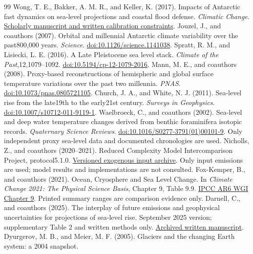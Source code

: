 \documentclass[11pt]{article}
\begin{document}
\begin{thebibliography}{99}
 Wong, T. E., Bakker, A. M. R., and Keller, K. (2017).
Impacts of Antarctic fast dynamics on sea-level projections and coastal flood defense.
\emph{Climatic Change}. \href{https://arxiv.org/abs/1612.07175}{Scholarly manuscript and written calibration constraints}.
 Jouzel, J., and coauthors (2007).
Orbital and millennial Antarctic climate variability over the past800,000 years.
\emph{Science}. \href{https://doi.org/10.1126/science.1141038}{doi:10.1126/science.1141038}.
 Spratt, R. M., and Lisiecki, L. E. (2016).
A Late Pleistocene sea level stack. \emph{Climate of the Past},12,1079--1092.
\href{https://doi.org/10.5194/cp-12-1079-2016}{doi:10.5194/cp-12-1079-2016}.
 Mann, M. E., and coauthors (2008).
Proxy-based reconstructions of hemispheric and global surface temperature
variations over the past two millennia. \emph{PNAS}.
\href{https://doi.org/10.1073/pnas.0805721105}{doi:10.1073/pnas.0805721105}.
 Church, J. A., and White, N. J. (2011).
Sea-level rise from the late19th to the early21st century. \emph{Surveys in Geophysics}.
\href{https://doi.org/10.1007/s10712-011-9119-1}{doi:10.1007/s10712-011-9119-1}.
 Waelbroeck, C., and coauthors (2002).
Sea-level and deep water temperature changes derived from benthic foraminifera
isotopic records. \emph{Quaternary Science Reviews}.
\href{https://doi.org/10.1016/S0277-3791(01)00101-9}{doi:10.1016/S0277-3791(01)00101-9}.
Only independent proxy sea-level data and documented chronologies are used.
 Nicholls, Z., and coauthors (2020--2021).
Reduced Complexity Model Intercomparison Project, protocol5.1.0.
\href{https://doi.org/10.5281/zenodo.4589756}{Versioned exogenous input archive}.
Only input emissions are used; model results and implementations are not consulted.
 Fox-Kemper, B., and coauthors (2021).
Ocean, Cryosphere and Sea Level Change. In \emph{Climate Change 2021:
The Physical Science Basis}, Chapter 9, Table 9.9.
\href{https://www.ipcc.ch/report/ar6/wg1/chapter/chapter-9/}{IPCC AR6 WGI Chapter 9}.
Printed summary ranges are comparison evidence only.
 Darnell, C., and coauthors (2025).
The interplay of future emissions and geophysical uncertainties for projections
of sea-level rise.
September 2025 version; supplementary Table 2 and written methods only.
\href{https://osf.io/download/52ev7/}{Archived written manuscript}.
 Dyurgerov, M. B., and Meier, M. F. (2005).
Glaciers and the changing Earth system: a 2004 snapshot.

\end{thebibliography}
\end{document}
